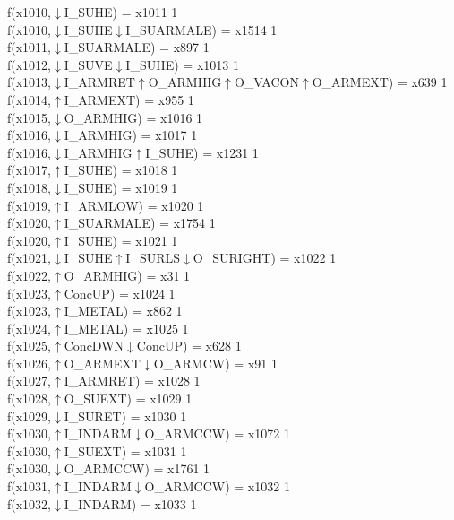 f(x1010,$\downarrow$I\_SUHE) = x1011 {1} \\
f(x1010,$\downarrow$I\_SUHE$\downarrow$I\_SUARMALE) = x1514 {1} \\
f(x1011,$\downarrow$I\_SUARMALE) = x897 {1} \\
f(x1012,$\downarrow$I\_SUVE$\downarrow$I\_SUHE) = x1013 {1} \\
f(x1013,$\downarrow$I\_ARMRET$\uparrow$O\_ARMHIG$\uparrow$O\_VACON$\uparrow$O\_ARMEXT) = x639 {1} \\
f(x1014,$\uparrow$I\_ARMEXT) = x955 {1} \\
f(x1015,$\downarrow$O\_ARMHIG) = x1016 {1} \\
f(x1016,$\downarrow$I\_ARMHIG) = x1017 {1} \\
f(x1016,$\downarrow$I\_ARMHIG$\uparrow$I\_SUHE) = x1231 {1} \\
f(x1017,$\uparrow$I\_SUHE) = x1018 {1} \\
f(x1018,$\downarrow$I\_SUHE) = x1019 {1} \\
f(x1019,$\uparrow$I\_ARMLOW) = x1020 {1} \\
f(x1020,$\uparrow$I\_SUARMALE) = x1754 {1} \\
f(x1020,$\uparrow$I\_SUHE) = x1021 {1} \\
f(x1021,$\downarrow$I\_SUHE$\uparrow$I\_SURLS$\downarrow$O\_SURIGHT) = x1022 {1} \\
f(x1022,$\uparrow$O\_ARMHIG) = x31 {1} \\
f(x1023,$\uparrow$ConcUP) = x1024 {1} \\
f(x1023,$\uparrow$I\_METAL) = x862 {1} \\
f(x1024,$\uparrow$I\_METAL) = x1025 {1} \\
f(x1025,$\uparrow$ConcDWN$\downarrow$ConcUP) = x628 {1} \\
f(x1026,$\uparrow$O\_ARMEXT$\downarrow$O\_ARMCW) = x91 {1} \\
f(x1027,$\uparrow$I\_ARMRET) = x1028 {1} \\
f(x1028,$\uparrow$O\_SUEXT) = x1029 {1} \\
f(x1029,$\downarrow$I\_SURET) = x1030 {1} \\
f(x1030,$\uparrow$I\_INDARM$\downarrow$O\_ARMCCW) = x1072 {1} \\
f(x1030,$\uparrow$I\_SUEXT) = x1031 {1} \\
f(x1030,$\downarrow$O\_ARMCCW) = x1761 {1} \\
f(x1031,$\uparrow$I\_INDARM$\downarrow$O\_ARMCCW) = x1032 {1} \\
f(x1032,$\downarrow$I\_INDARM) = x1033 {1} \\
